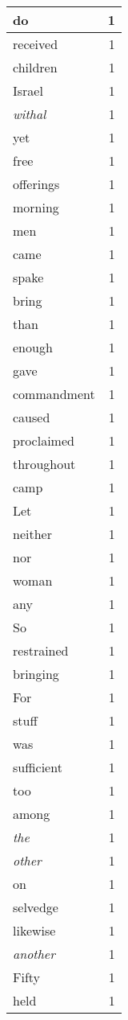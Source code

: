 \begin{center}
\begin{longtable}{l|r}
do & 1 \\ \hline
received & 1 \\ \hline
children & 1 \\ \hline
Israel & 1 \\ \hline
\emph{withal} & 1 \\ \hline
yet & 1 \\ \hline
free & 1 \\ \hline
offerings & 1 \\ \hline
morning & 1 \\ \hline
men & 1 \\ \hline
came & 1 \\ \hline
spake & 1 \\ \hline
bring & 1 \\ \hline
than & 1 \\ \hline
enough & 1 \\ \hline
gave & 1 \\ \hline
commandment & 1 \\ \hline
caused & 1 \\ \hline
proclaimed & 1 \\ \hline
throughout & 1 \\ \hline
camp & 1 \\ \hline
Let & 1 \\ \hline
neither & 1 \\ \hline
nor & 1 \\ \hline
woman & 1 \\ \hline
any & 1 \\ \hline
So & 1 \\ \hline
restrained & 1 \\ \hline
bringing & 1 \\ \hline
For & 1 \\ \hline
stuff & 1 \\ \hline
was & 1 \\ \hline
sufficient & 1 \\ \hline
too & 1 \\ \hline
among & 1 \\ \hline
\emph{the} & 1 \\ \hline
\emph{other} & 1 \\ \hline
on & 1 \\ \hline
selvedge & 1 \\ \hline
likewise & 1 \\ \hline
\emph{another} & 1 \\ \hline
Fifty & 1 \\ \hline
held & 1 \\ \hline

\end{longtable}
\end{center}
